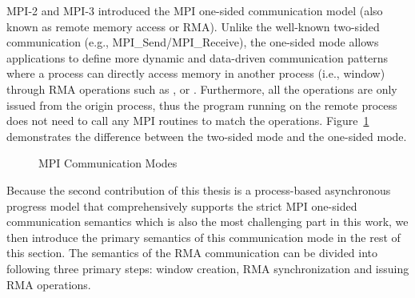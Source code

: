 MPI-2 and MPI-3 introduced the MPI one-sided communication model
(also known as remote memory access or RMA). Unlike the well-known
two-sided communication (e.g., MPI\_Send\slash MPI\_Receive), the one-sided
mode allows applications to define more dynamic and data-driven communication
patterns where a process can directly access memory in another process
(i.e., window) through RMA operations such as ,  or
. Furthermore, all the operations are only issued from the
origin process, thus the program running on the remote process does not
need to call any MPI routines to match the operations. Figure~\ref{fig:back-rma}
demonstrates the difference between the two-sided mode and the one-sided mode.

\begin{figure}%
\centering
{}
\hspace{-0.02\textwidth}
\caption{MPI Communication Modes}
\label{fig:back-rma}
\end{figure}


Because the second contribution of this thesis is a process-based asynchronous
progress model that comprehensively supports the strict MPI one-sided
communication semantics which is also the most challenging part in this work,
we then introduce the primary semantics of this communication mode in the rest
of this section. The semantics of the RMA communication can be divided into
following three primary steps: window creation, RMA synchronization and
issuing RMA operations.

